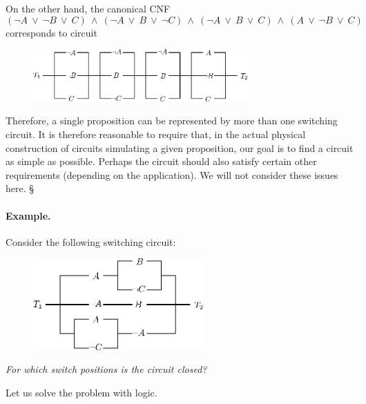 \documentclass[11pt,paper=b5,footinclude,headinclude]{scrbook} %
\def\ali {{~\vee~}}
\def\inn {{~\wedge~}}
\def\kz{{\hfill{\S}}}%
\theoremstyle{remark}
\theoremstyle{definition} %
\begin{document}
On the other hand, the canonical CNF
$$(\neg A\ali\neg B \ali C) \inn (\neg A\ali B \ali \neg C)\inn
(\neg A\ali B \ali C) \inn (A\ali \neg B \ali C)$$
corresponds to circuit
\begin{figure}[h]
\begin{center}
\includegraphics[height=20mm]{vezje-KNO.eps}\label{fig:vezje-KNO}
\end{center}
\end{figure}

Therefore, a single proposition can be represented by more than one switching circuit.
It is therefore reasonable to require that, in the actual physical
construction of circuits simulating a given proposition, our goal is to find a
circuit as simple as possible. Perhaps the circuit should also satisfy certain other requirements
(depending on the application). We will not consider these issues here.
\kz

\bigskip
\paragraph{Example.}
Consider the following switching circuit:

\begin{figure}[h!]
\begin{center}
\includegraphics[height=35mm]{vezje2.eps}\label{fig:vezje2}
\end{center}
\end{figure}

{\em For which switch positions is the circuit closed?}

Let us solve the problem with logic.
\end{document}
